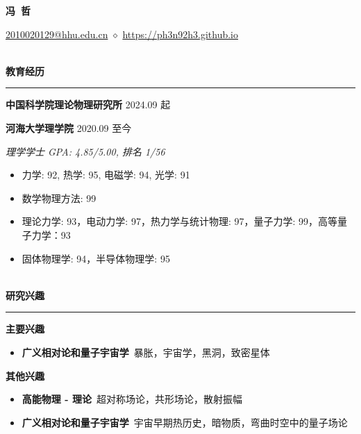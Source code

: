 \documentclass[12pt]{article}
\renewcommand*{\section}[1]{
    ~\\ \noindent \textbf{#1} \medskip \hrule \medskip
}
\begin{document}
\pagestyle{empty}


\begin{center}
    \LARGE{\textbf{冯\ 哲}}
\end{center}

\begin{center}
    \href{mailto:2010020129@hhu.edu.cn}{2010020129@hhu.edu.cn} $\diamond$ \href{https://ph3n92h3.github.io}{https://ph3n92h3.github.io}
\end{center}


\section{教育经历}

\textbf{中国科学院理论物理研究所} \hfill 2024.09 起

\textbf{河海大学理学院} \hfill 2020.09 至今

\smallskip \quad \textit{理学学士 \hfill GPA: 4.85/5.00, 排名 1/56}

\begin{itemize}
    \item 力学: 92, 热学: 95, 电磁学: 94, 光学: 91
    \item 数学物理方法: 99
    \item 理论力学: 93，电动力学: 97，热力学与统计物理: 97，量子力学: 99，高等量子力学：93
    \item 固体物理学: 94，半导体物理学: 95
\end{itemize}


\section{研究兴趣}

\textbf{主要兴趣}
\begin{itemize}
    \item \textbf{广义相对论和量子宇宙学}\ 暴胀，宇宙学，黑洞，致密星体
\end{itemize}

\textbf{其他兴趣}
\begin{itemize}
    \item \textbf{高能物理 - 理论}\ 超对称场论，共形场论，散射振幅
    \item \textbf{广义相对论和量子宇宙学}\ 宇宙早期热历史，暗物质，弯曲时空中的量子场论
\end{itemize}
\end{document}

